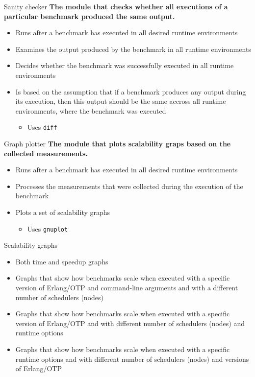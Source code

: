 \documentclass{beamer}
\begin{document}
\begin{frame}[t]{Sanity checker}
	{\bf The module that checks whether all executions of a particular benchmark produced the same output.}
    \begin{itemize}
		\item Runs \textcolor{burgundy}{after} a benchmark has executed in all desired runtime environments
		\item \textcolor{burgundy}{Examines} the output produced by the benchmark in all runtime environments
		\item Decides whether the benchmark was \textcolor{burgundy}{successfully executed} in all runtime environments
		\item Is based on the assumption that if a benchmark produces any output during its execution, then this output should be \textcolor{burgundy}{the same accross all runtime environments}, where the benchmark was executed
			\begin{itemize}
				\item Uses \texttt{diff}
			\end{itemize}
    \end{itemize}
\end{frame}

\begin{frame}[t]{Graph plotter}
	{\bf The module that plots scalability graps based on the collected measurements.}
    \begin{itemize}
		\item Runs \textcolor{burgundy}{after} a benchmark has executed in all desired runtime environments
		\item Processes the \textcolor{burgundy}{measurements} that were collected during the execution of the benchmark
		\item Plots a set of scalability graphs
			\begin{itemize}
				\item Uses \texttt{gnuplot}
			\end{itemize}
    \end{itemize}
\end{frame}

\begin{frame}[t]{Scalability graphs}
	\begin{itemize}
		\item Both \textcolor{burgundy}{time} and \textcolor{burgundy}{speedup} graphs
		\item Graphs that show how benchmarks scale when executed with a specific version of Erlang/OTP and command-line arguments and with a \textcolor{burgundy}{different number of schedulers (nodes)}
		\item Graphs that show how benchmarks scale when executed with a specific version of Erlang/OTP and with \textcolor{burgundy}{different number of schedulers (nodes) and runtime options}
		\item Graphs that show how benchmarks scale when executed with a specific runtime options and with \textcolor{burgundy}{different number of schedulers (nodes) and versions of Erlang/OTP}
	\end{itemize}
\end{frame}
\end{document}

